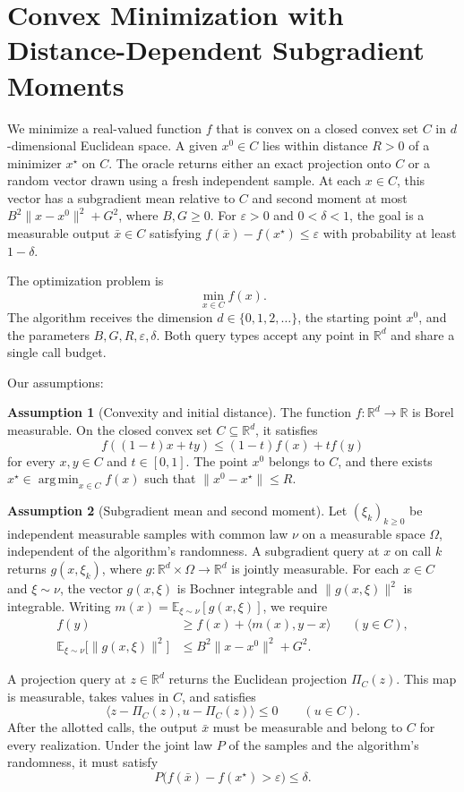 \documentclass[10pt]{article}
\theoremstyle{definition}
\newtheorem{assumption}{Assumption}
\begin{document}
\section*{Convex Minimization with Distance-Dependent Subgradient Moments}
We minimize a real-valued function $f$ that is convex on a closed convex set $C$ in $d$-dimensional Euclidean space. A given $x^0\in C$ lies within distance $R>0$ of a minimizer $x^\star$ on $C$. The oracle returns either an exact projection onto $C$ or a random vector drawn using a fresh independent sample. At each $x\in C$, this vector has a subgradient mean relative to $C$ and second moment at most $B^2\|x-x^0\|^2+G^2$, where $B,G\geq 0$. For $\varepsilon>0$ and $0<\delta<1$, the goal is a measurable output $\bar{x}\in C$ satisfying $f(\bar{x})-f(x^\star)\leq\varepsilon$ with probability at least $1-\delta$.

The optimization problem is
\[
\min_{x\in C} f(x).
\]
The algorithm receives the dimension $d\in\{0,1,2,\ldots\}$, the starting point $x^0$, and the parameters $B,G,R,\varepsilon,\delta$. Both query types accept any point in $\mathbb{R}^d$ and share a single call budget.

Our assumptions:
\begin{assumption}[Convexity and initial distance]
The function $f:\mathbb{R}^d\to\mathbb{R}$ is Borel measurable. On the closed convex set $C\subseteq\mathbb{R}^d$, it satisfies
\[
f((1-t)x+ty)\leq (1-t)f(x)+tf(y)
\]
for every $x,y\in C$ and $t\in[0,1]$. The point $x^0$ belongs to $C$, and there exists $x^\star\in\operatorname*{arg\,min}_{x\in C} f(x)$ such that $\|x^0-x^\star\|\leq R$.
\end{assumption}

\begin{assumption}[Subgradient mean and second moment]
Let $(\xi_k)_{k\geq 0}$ be independent measurable samples with common law $\nu$ on a measurable space $\Omega$, independent of the algorithm's randomness. A subgradient query at $x$ on call $k$ returns $g(x,\xi_k)$, where $g:\mathbb{R}^d\times\Omega\to\mathbb{R}^d$ is jointly measurable. For each $x\in C$ and $\xi\sim\nu$, the vector $g(x,\xi)$ is Bochner integrable and $\|g(x,\xi)\|^2$ is integrable. Writing $m(x)=\mathbb{E}_{\xi\sim\nu}[g(x,\xi)]$, we require
\[
\begin{aligned}
f(y)&\geq f(x)+\langle m(x),y-x\rangle &&(y\in C),\\
\mathbb{E}_{\xi\sim\nu}\bigl[\|g(x,\xi)\|^2\bigr]&\leq B^2\|x-x^0\|^2+G^2.
\end{aligned}
\]
\end{assumption}

A projection query at $z\in\mathbb{R}^d$ returns the Euclidean projection $\Pi_C(z)$. This map is measurable, takes values in $C$, and satisfies
\[
\langle z-\Pi_C(z),u-\Pi_C(z)\rangle\leq 0
\qquad (u\in C).
\]
After the allotted calls, the output $\bar{x}$ must be measurable and belong to $C$ for every realization. Under the joint law $P$ of the samples and the algorithm's randomness, it must satisfy
\[
P\bigl(f(\bar{x})-f(x^\star)>\varepsilon\bigr)\leq\delta.
\]
\end{document}
